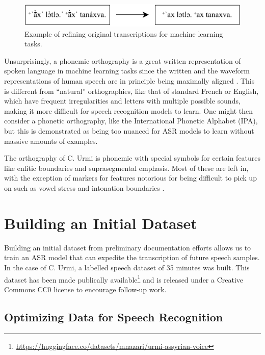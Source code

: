 \documentclass[letterpaper]{article} %
\begin{document}
\begin{figure}[H]
    \centering
    \includegraphics[width=\columnwidth]{transcription.pdf}
    \caption{Example of refining original transcriptions for machine learning tasks.}
    \label{fig:transcription}
\end{figure}

Unsurprisingly, a phonemic orthography is a great written representation of spoken language in machine learning tasks since the written and the waveform representations of human speech are in principle being maximally aligned \cite{9414478, khare2021low}. This is different from ``natural'' orthographies, like that of standard French or English, which have frequent irregularities and letters with multiple possible sounds, making it more difficult for speech recognition models to learn. One might then consider a phonetic orthography, like the International Phonetic Alphabet (IPA), but this is demonstrated as being too nuanced for ASR models to learn without massive amounts of examples.


The orthography of C. Urmi is phonemic with special symbols for certain features like enlitic boundaries and suprasegmental emphasis. Most of these are left in, with the exception of markers for features notorious for being difficult to pick up on such as vowel stress and intonation boundaries \cite{bosch2000emotions,vicsi2006prosodic}.

\section{Building an Initial Dataset}

Building an initial dataset from preliminary documentation efforts allows us to train an ASR model that can expedite the transcription of future speech samples. In the case of C. Urmi, a labelled speech dataset of 35 minutes was built. This dataset has been made publically available\footnote{\url{https://huggingface.co/datasets/mnazari/urmi-assyrian-voice}} and is released under a Creative Commons CC0 license to encourage follow-up work.

\subsection{Optimizing Data for Speech Recognition}
\end{document}
